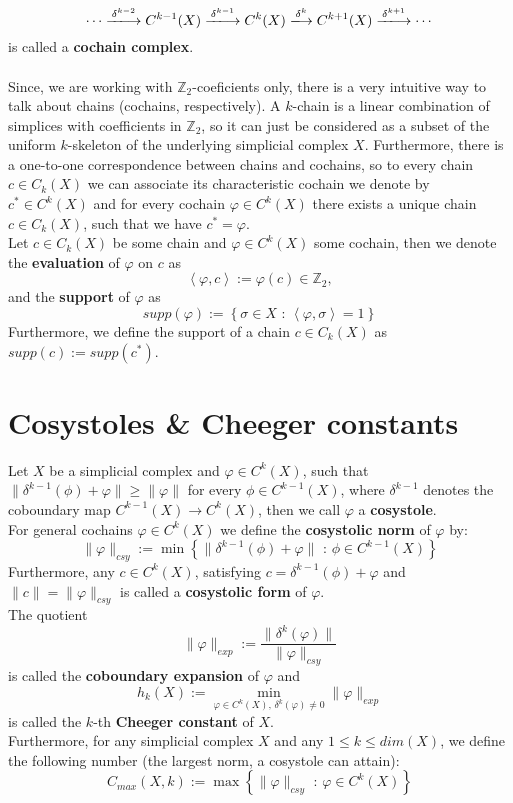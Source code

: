 \[
\cdots\xlongrightarrow{\delta^{k-2}} C^{k-1}(X)\xlongrightarrow{\delta^{k-1}} C^k(X)\xlongrightarrow{\delta^k} C^{k+1}(X)\xlongrightarrow{\delta^{k+1}}\cdots
\]
is called a \textbf{cochain complex}.\\
\\
Since, we are working with \(\mathbb{Z}_2\)-coeficients only, there is a very intuitive way to talk about chains (cochains, respectively). A \(k\)-chain is a linear combination of simplices with coefficients in \(\mathbb{Z}_2\), so it can just be considered as a subset of the uniform \(k\)-skeleton of the underlying simplicial complex \(X\). Furthermore, there is a one-to-one correspondence between chains and cochains, so to every chain \(c\in C_k(X)\) we can associate its characteristic cochain we denote by \(c^*\in C^k(X)\) and for every cochain \(\varphi\in C^k(X)\) there exists a unique chain \(c\in C_k(X)\), such that we have \(c^*=\varphi\).\\
Let \(c\in C_k(X)\) be some chain and \(\varphi\in C^k(X)\) some cochain, then we denote the \textbf{evaluation} of \(\varphi\) on \(c\) as
\[
\left\langle\varphi,c\right\rangle:=\varphi(c)\in\mathbb{Z}_2,
\]
and the \textbf{support} of \(\varphi\) as
\[
supp(\varphi):=\left\{\sigma\in X\text{ : }\left\langle\varphi,\sigma\right\rangle=1\right\}
\]
Furthermore, we define the support of a chain \(c\in C_k(X)\) as \(supp(c):=supp(c^*)\).\\

\section{Cosystoles \& Cheeger constants}

Let \(X\) be a simplicial complex and \(\varphi\in C^k(X)\), such that \(\|\delta^{k-1}(\phi)+\varphi\|\geq\|\varphi\|\) for every \(\phi\in C^{k-1}(X)\), where \(\delta^{k-1}\) denotes the coboundary map \(C^{k-1}(X)\rightarrow C^k(X)\), then we call \(\varphi\) a \textbf{cosystole}.\\
For general cochains \(\varphi\in C^k(X)\) we define the \textbf{cosystolic norm} of \(\varphi\) by:
\[
\|\varphi\|_{csy}:=\min\left\{\|\delta^{k-1}(\phi)+\varphi\|\text{ : }\phi\in C^{k-1}(X)\right\}
\]
Furthermore, any \(c\in C^k(X)\), satisfying \(c=\delta^{k-1}(\phi)+\varphi\) and \(\|c\|=\|\varphi\|_{csy}\) is called a \textbf{cosystolic form} of \(\varphi\).\\
The quotient
\[
\|\varphi\|_{exp}:=\frac{\|\delta^k(\varphi)\|}{\|\varphi\|_{csy}}
\]
is called the \textbf{coboundary expansion} of \(\varphi\) and
\[
h_k(X):=\min\limits_{\varphi\in C^k(X)\text{, }\delta^k(\varphi)\neq 0}\|\varphi\|_{exp}
\]
is called the \(k\)-th \textbf{Cheeger constant} of \(X\).\\
Furthermore, for any simplicial complex \(X\) and any \(1\leq k\leq dim(X)\), we define the following number (the largest norm, a cosystole can attain):
\[
C_{max}(X,k):=\max\left\{\|\varphi\|_{csy}\text{ : }\varphi\in C^k(X)\right\}
\]

